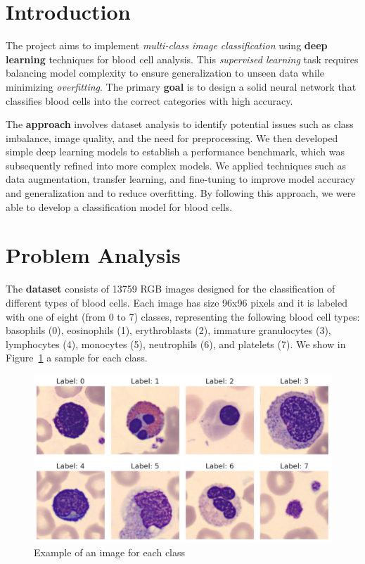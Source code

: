 \documentclass[11pt]{article}
\begin{document}
    \begin{multicols*}{2}        
        \section{Introduction}

        The project aims to implement \textit{multi-class image classification} using \textbf{deep learning} techniques for blood cell analysis. This \textit{supervised learning} task requires balancing model complexity to ensure generalization to unseen data while minimizing \textit{overfitting}. The primary \textbf{goal} is to design a solid neural network that classifies blood cells into the correct categories with high accuracy.
        
        The \textbf{approach} involves dataset analysis to identify potential issues such as class imbalance, image quality, and the need for preprocessing. We then developed simple deep learning models to establish a performance benchmark, which was subsequently refined into more complex models. We applied techniques such as data augmentation, transfer learning, and fine-tuning to improve model accuracy and generalization and to reduce overfitting. By following this approach, we were able to develop a classification model for blood cells.
        
        \section{Problem Analysis}

        The \textbf{dataset} consists of 13759 RGB images designed for the classification of different types of blood cells. Each image has size 96x96 pixels and it is labeled with one of eight (from 0 to 7) classes, representing the following blood cell types: basophils (0), eosinophils (1), erythroblasts (2), immature granulocytes (3), lymphocytes (4), monocytes (5), neutrophils (6), and platelets (7). We show in Figure~\ref{fig:dataset} a sample for each class.

        \begin{figure}[H]
            \centering
            \includegraphics[width=\linewidth]{figures/SCR-20241122-nvwz.png}
            \caption{Example of an image for each class}
            \label{fig:dataset}
        \end{figure}


\end{multicols*}
\end{document}
